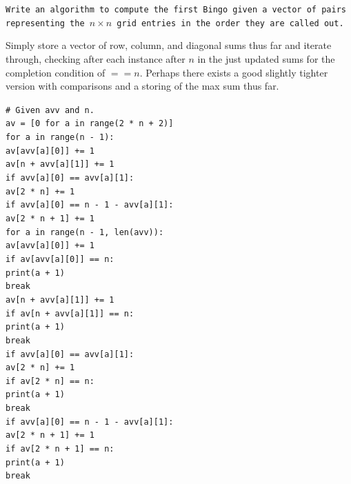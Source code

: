 \texttt{Write an algorithm to compute the first Bingo given a vector of pairs representing the $n \times n$ grid entries in the order they are called out.}

Simply store a vector of row, column, and diagonal sums thus far and iterate through, checking after each instance after $n$ in the just updated sums for the completion condition of $==n$. Perhaps there exists a good slightly tighter version with comparisons and a storing of the max sum thus far.

\texttt{\# Given avv and n.} \\
\texttt{av = [0 for a in range(2 * n + 2)]} \\
\texttt{for a in range(n - 1):} \\
\phantom{xxxx}\texttt{av[avv[a][0]] += 1} \\
\phantom{xxxx}\texttt{av[n + avv[a][1]] += 1} \\
\phantom{xxxx}\texttt{if avv[a][0] == avv[a][1]:} \\
\phantom{xxxxxxxx}\texttt{av[2 * n] += 1} \\
\phantom{xxxx}\texttt{if avv[a][0] == n - 1 - avv[a][1]:} \\
\phantom{xxxxxxxx}\texttt{av[2 * n + 1] += 1} \\
\texttt{for a in range(n - 1, len(avv)):} \\
\phantom{xxxx}\texttt{av[avv[a][0]] += 1} \\
\phantom{xxxx}\texttt{if av[avv[a][0]] == n:} \\
\phantom{xxxxxxxx}\texttt{print(a + 1)} \\
\phantom{xxxxxxxx}\texttt{break} \\
\phantom{xxxx}\texttt{av[n + avv[a][1]] += 1} \\
\phantom{xxxx}\texttt{if av[n + avv[a][1]] == n:} \\
\phantom{xxxxxxxx}\texttt{print(a + 1)} \\
\phantom{xxxxxxxx}\texttt{break} \\
\phantom{xxxx}\texttt{if avv[a][0] == avv[a][1]:} \\
\phantom{xxxxxxxx}\texttt{av[2 * n] += 1} \\
\phantom{xxxxxxxx}\texttt{if av[2 * n] == n:} \\
\phantom{xxxxxxxxxxxx}\texttt{print(a + 1)} \\
\phantom{xxxxxxxxxxxx}\texttt{break} \\
\phantom{xxxx}\texttt{if avv[a][0] == n - 1 - avv[a][1]:} \\
\phantom{xxxxxxxx}\texttt{av[2 * n + 1] += 1} \\
\phantom{xxxxxxxx}\texttt{if av[2 * n + 1] == n:} \\
\phantom{xxxxxxxxxxxx}\texttt{print(a + 1)} \\
\phantom{xxxxxxxxxxxx}\texttt{break}

